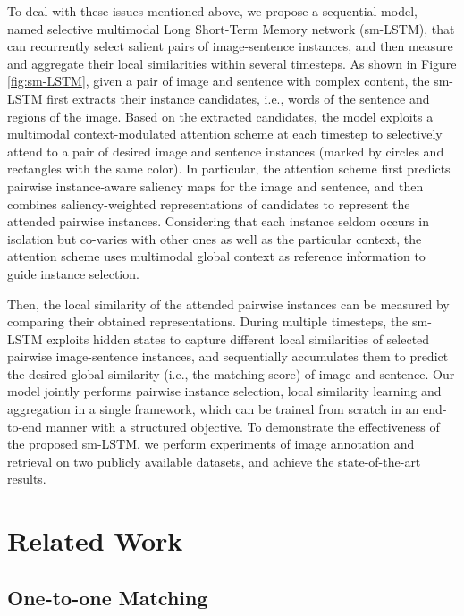 \documentclass[10pt,twocolumn,letterpaper]{article}
\begin{document}
To deal with these issues mentioned above,
we propose a sequential model, named selective multimodal Long Short-Term Memory
network (sm-LSTM),
that can recurrently select salient pairs of image-sentence instances,
and then measure and aggregate their local similarities within several timesteps.
As shown in Figure \ref{fig:sm-LSTM},
given a pair of image and sentence with complex content,
the sm-LSTM first extracts their instance candidates, i.e.,
words of the sentence and regions of the image.
Based on the extracted candidates, the model exploits a multimodal context-modulated attention
scheme at each timestep to selectively attend to a pair of desired image
and sentence instances (marked by circles and rectangles with the same color).
In particular, the attention scheme first predicts pairwise
instance-aware saliency maps for the image and sentence,
and then combines saliency-weighted representations of candidates to represent the attended pairwise instances.
Considering that each instance seldom occurs in isolation but
co-varies with other ones as well as the particular context,
the attention scheme uses multimodal global context as reference
information to guide instance selection.

Then, the local similarity of the attended pairwise instances can
be measured by comparing their obtained representations.
During multiple timesteps, the sm-LSTM exploits hidden states to
capture different local similarities of
selected pairwise image-sentence instances, and sequentially accumulates them
to predict the desired global similarity (i.e., the matching score) of image and sentence.
Our model jointly performs pairwise instance selection, local similarity learning and aggregation in a single framework,
which can be trained from scratch in an end-to-end manner
with a structured objective.
To demonstrate the effectiveness of the proposed sm-LSTM,
we perform experiments of image annotation and retrieval on two publicly available datasets,
and achieve the state-of-the-art results.





\section{Related Work}



\subsection{One-to-one Matching}
\end{document}
